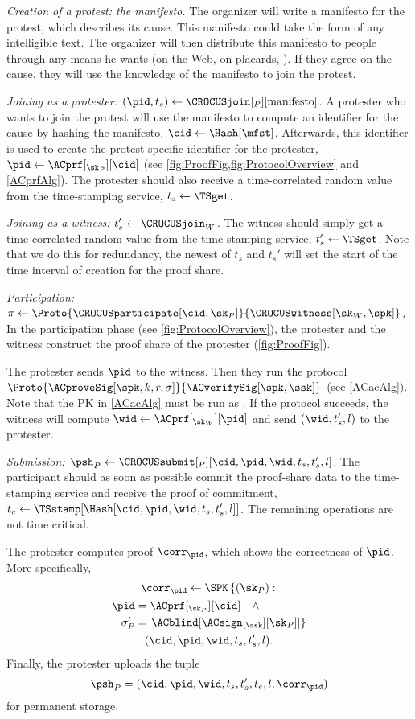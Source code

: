 \emph{Creation of a protest: the manifesto.}
The organizer will write a manifesto for the protest, which describes its cause.
This manifesto could take the form of any intelligible text.
The organizer will then distribute this manifesto to people through any means he wants (\eg on the Web, on placards, \etc).
If they agree on the cause, they will use the knowledge of the manifesto to join the protest.


\emph{Joining as a protester: \((\pid, t_s)\gets 
    \CROCUSjoin[_P][\text{manifesto}]\).}
A protester who wants to join the protest will use the manifesto to compute an identifier for the cause by hashing the manifesto, \(\cid\gets \Hash[\mfst]\).
Afterwards, this identifier is used to create the protest-specific identifier 
for the protester, \(\pid\gets \ACprf[_{\sk_P}][\cid]\) (see 
\cref{fig:ProofFig,fig:ProtocolOverview} and \cref{ACprfAlg}).
The protester should also receive a time-correlated random value from the 
time-stamping service, \(t_s\gets \TSget\).


\emph{Joining as a witness: \(t_s'\gets \CROCUSjoin_W\).}
The witness should simply get a time-correlated random value from the time-stamping service, \(t_s'\gets \TSget\).
Note that we do this for redundancy, the newest of \(t_s\) and \(t_s'\) will 
set the start of the time interval of creation for the proof share.


\emph{Participation: \(\pi\gets
    \Proto{\CROCUSparticipate[\cid, \sk_P]}{\CROCUSwitness[\sk_W, \spk]}\),}
In the participation phase (see \cref{fig:ProtocolOverview}), the protester and 
the witness construct the proof share of the protester (\cref{fig:ProofFig}).

The protester sends \(\pid\) to the witness.
Then they run the protocol \(\Proto{\ACproveSig[\spk, k, r, 
    \sigma]}{\ACverifySig[\spk, \ssk]}\) (see \cref{ACacAlg}).
Note that the \ac{PK} in \cref{ACacAlg} must be run as .
If the protocol succeeds, the witness will compute \(\wid \gets 
  \ACprf[_{\sk_W}][\pid]\) and send \((\wid, t_s', l)\) to the protester.


\emph{Submission: \(\psh_P\gets \CROCUSsubmit[_P][\cid, \pid, \wid, t_s, t_s',  l]\).}
The participant should as soon as possible commit the proof-share data to the 
time-stamping service and receive the proof of commitment, \(t_e\gets 
  \TSstamp[\Hash[\cid, \pid, \wid, t_s, t_s', l]]\).
The remaining operations are not time critical.

The protester computes  proof \(\corr_{\pid}\), which shows the 
correctness of \(\pid\).
More specifically,
\begin{multline*}
  \corr_{\pid}\gets \SPK\left\{ (\sk_P) : \right. \\
    \begin{aligned}
      \pid &= \ACprf[_{\sk_P}][\cid] \quad \land \\
      \sigma_P' &= \left. \ACblind[\ACsign[_{\ssk}][\sk_P]] \right\}
    \end{aligned} \\
      (\cid, \pid, \wid, t_s, t_s', l).
\end{multline*}
Finally, the protester uploads the tuple \[
  \psh_P = (\cid, \pid, \wid, t_s, t_s', t_e, l, \corr_{\pid})
\] for permanent storage.

